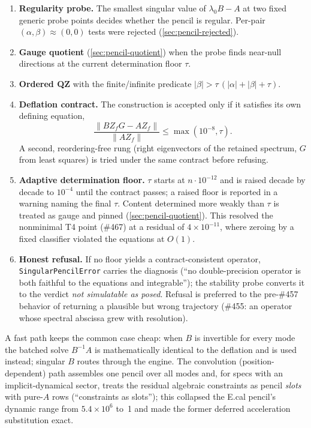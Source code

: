 \begin{enumerate}
  \item \textbf{Regularity probe.} The smallest singular value of
    $\lambda_0 B - A$ at two fixed generic probe points decides whether
    the pencil is regular. Per-pair $(\alpha, \beta) \approx (0, 0)$
    tests were rejected (\cref{sec:pencil-rejected}).
  \item \textbf{Gauge quotient} (\cref{sec:pencil-quotient}) when the
    probe finds near-null directions at the current determination floor
    $\tau$.
  \item \textbf{Ordered QZ} with the finite/infinite predicate
    $|\beta| > \tau\,(|\alpha| + |\beta| + \tau)$.
  \item \textbf{Deflation contract.} The construction is accepted only
    if it satisfies its own defining equation,
    \begin{equation}
      \frac{\lVert B Z_f G - A Z_f \rVert}{\lVert A Z_f \rVert}
      \le \max(10^{-8}, \tau) .
      \label{eq:pencil-contract}
    \end{equation}
    A second, reordering-free rung (right eigenvectors of the retained
    spectrum, $G$ from least squares) is tried under the same contract
    before refusing.
  \item \textbf{Adaptive determination floor.} $\tau$ starts at
    $n \cdot 10^{-12}$ and is raised decade by decade to $10^{-4}$
    until the contract passes; a raised floor is reported in a warning
    naming the final $\tau$. Content determined more weakly than $\tau$
    is treated as gauge and pinned (\cref{sec:pencil-quotient}). This
    resolved the nonminimal T4 point (\#467) at a residual of
    $4\times10^{-11}$, where zeroing by a fixed classifier violated the
    equations at $O(1)$.
  \item \textbf{Honest refusal.} If no floor yields a
    contract-consistent operator, \texttt{SingularPencilError} carries
    the diagnosis (``no double-precision operator is both faithful to
    the equations and integrable''); the stability probe converts it to
    the verdict \emph{not simulatable as posed}. Refusal is preferred to
    the pre-\#457 behavior of returning a plausible but wrong trajectory
    (\#455: an operator whose spectral abscissa grew with resolution).
\end{enumerate}

A fast path keeps the common case cheap: when $B$ is invertible for
every mode the batched solve $B^{-1}A$ is mathematically identical to
the deflation and is used instead; singular $B$ routes through the
engine. The convolution (position-dependent) path assembles one pencil
over all modes and, for specs with an implicit-dynamical sector, treats
the residual algebraic constraints as pencil \emph{slots} with pure-$A$
rows (``constraints as slots''); this collapsed the E.cal pencil's
dynamic range from $5.4\times10^{6}$ to~1 and made the former deferred
acceleration substitution exact.

